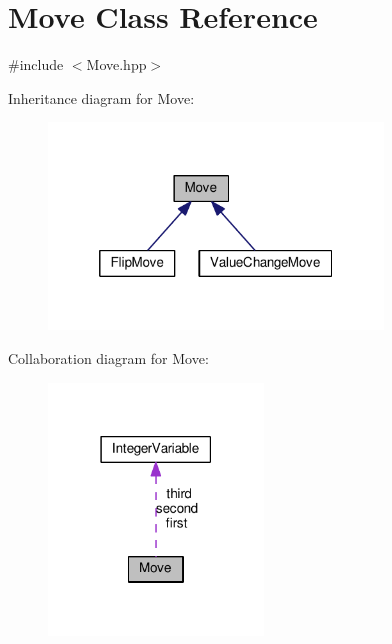 \hypertarget{class_move}{\section{Move Class Reference}
\label{class_move}
}


{\ttfamily \#include $<$Move.\-hpp$>$}



Inheritance diagram for Move\-:\nopagebreak
\begin{figure}[H]
\begin{center}
\leavevmode
\includegraphics[width=252pt]{class_move__inherit__graph}
\end{center}
\end{figure}


Collaboration diagram for Move\-:\nopagebreak
\begin{figure}[H]
\begin{center}
\leavevmode
\includegraphics[width=162pt]{class_move__coll__graph}
\end{center}
\end{figure}
